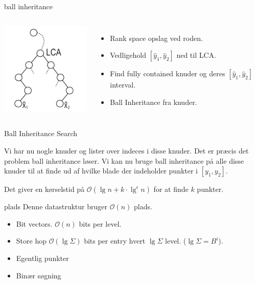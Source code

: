 \documentclass[pdf]{beamer}
\begin{document}
\begin{frame}{ball inheritance}
  \begin{center}
    \begin{columns}
        \includegraphics[scale=1.5]{pictures/BIS.pdf}
        \begin{itemize}
          \item Rank space opslag ved roden.
          \item Vedligehold $[\hat{y}_1, \hat{y}_2]$ ned til LCA.
          \item Find fully contained knuder og deres $[\hat{y}_1, \hat{y}_2]$ interval.
          \item Ball Inheritance fra knuder.
        \end{itemize}
      \end{columns}
  \end{center}
\end{frame}

\begin{frame}{Ball Inheritance Search}

  Vi har nu nogle knuder og lister over indeces i disse knuder. Det er præcis det problem ball inheritance løser. Vi kan nu bruge ball inheritance på alle disse knuder til at finde ud af hvilke blade der indeholder punkter i $[y_1, y_2]$.

  Det giver en kørselstid på $\mathcal{O}(\lg n + k\cdot\lg^\epsilon n)$ for at finde $k$ punkter.

\end{frame}

\begin{frame}{plads}
  Denne datastruktur bruger $\mathcal{O}(n)$ plads.
  \begin{itemize}
    \item Bit vectors. $\mathcal{O}(n)$ bits per level.
      \pause
    \item Store hop $\mathcal{O}(\lg \Sigma)$ bits per entry hvert $\lg \Sigma$ level. ($\lg \Sigma = B^i$).
      \pause
    \item Egentlig punkter
      \pause
    \item Binær søgning
  \end{itemize}
\end{frame}
\end{document}
